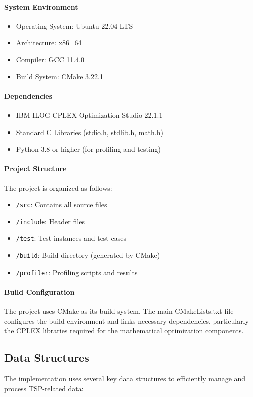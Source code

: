 \documentclass{article}
\begin{document}
\paragraph{System Environment}
\begin{itemize}
	\item Operating System: Ubuntu 22.04 LTS
	\item Architecture: x86\_64
	\item Compiler: GCC 11.4.0
	\item Build System: CMake 3.22.1
\end{itemize}

\paragraph{Dependencies}
\begin{itemize}
	\item IBM ILOG CPLEX Optimization Studio 22.1.1
	\item Standard C Libraries (stdio.h, stdlib.h, math.h)
	\item Python 3.8 or higher (for profiling and testing)
\end{itemize}

\paragraph{Project Structure}
The project is organized as follows:
\begin{itemize}
	\item \texttt{/src}: Contains all source files
	\item \texttt{/include}: Header files
	\item \texttt{/test}: Test instances and test cases
	\item \texttt{/build}: Build directory (generated by CMake)
	\item \texttt{/profiler}: Profiling scripts and results
\end{itemize}

\paragraph{Build Configuration}
The project uses CMake as its build system. The main CMakeLists.txt file configures the build environment and links necessary dependencies, 
particularly the CPLEX libraries required for the mathematical optimization components.

\subsection{Data Structures}
The implementation uses several key data structures to efficiently manage and process TSP-related data:
\end{document}
